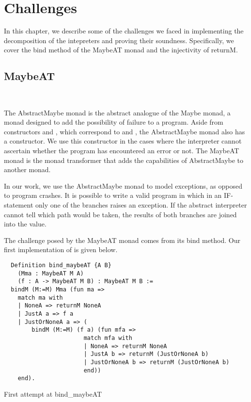 \chapter{Challenges}

In this chapter, we describe some of the challenges we faced in implementing
the decomposition of the intepreters and proving their soundness. Specifically,
we cover the bind method of the MaybeAT monad and the injectivity of returnM.

\section{MaybeAT}~\label{sec:challenges-maybeat}

The AbstractMaybe monad is the abstract analogue of the Maybe monad, a monad
designed to add the possibility of failure to a program. Aside from
constructors  and , which correspond to  and
, the AbstractMaybe monad also has a  constructor.
We use this constructor in the cases where the interpreter cannot ascertain
whether the program has encountered an error or not. The MaybeAT monad is the
monad transformer that adds the capabilities of AbstractMaybe to another monad.

In our work, we use the AbstractMaybe monad to model exceptions, as opposed to
program crashes. It is possible to write a valid program in which in an
IF-statement only one of the branches raises an exception. If the abstract
interpreter cannot tell which path would be taken, the results of both branches
are joined into the  value.

The challenge posed by the MaybeAT monad comes from its bind method. Our
first implementation of  is given below.

\begin{listing}[H]
\begin{verbatim}
  Definition bind_maybeAT {A B} 
    (Mma : MaybeAT M A)
    (f : A -> MaybeAT M B) : MaybeAT M B :=
  bindM (M:=M) Mma (fun ma =>
    match ma with
    | NoneA => returnM NoneA
    | JustA a => f a
    | JustOrNoneA a => (
        bindM (M:=M) (f a) (fun mfa =>
                       match mfa with
                       | NoneA => returnM NoneA
                       | JustA b => returnM (JustOrNoneA b)
                       | JustOrNoneA b => returnM (JustOrNoneA b)
                       end))
    end).
\end{verbatim}
\caption{First attempt at bind\_maybeAT}
\label{lst:bind_maybeAT}
\end{listing}


